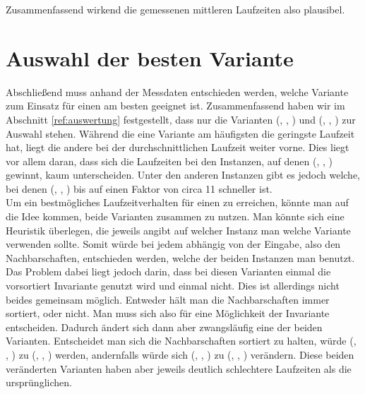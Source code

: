 Zusammenfassend wirkend die gemessenen mittleren Laufzeiten 
also plausibel.




\section{Auswahl der besten Variante}
\label{sec:entscheidung}
Abschließend muss anhand der Messdaten entschieden werden, welche Variante zum Einsatz für
einen \ct{} am besten geeignet ist.
Zusammenfassend haben wir im Abschnitt \ref{ref:auswertung} festgestellt, 
dass nur die Varianten (\SorSor, \true, \distr) und (\SeaUSet, \false, \perm) zur Auswahl stehen.
Während die eine Variante am häufigsten die geringste Laufzeit hat, liegt die andere 
bei der durchschnittlichen Laufzeit weiter vorne. Dies liegt vor allem daran, dass sich 
die Laufzeiten bei den Instanzen, auf denen (\SeaUSet, \false, \perm) \glqq gewinnt\grqq{}, kaum unterscheiden.
Unter den anderen Instanzen gibt es jedoch welche, bei denen (\SorSor, \true, \distr) bis auf einen
Faktor von circa 11 schneller ist.
\\

Um ein bestmögliches Laufzeitverhalten für einen \ct{} zu erreichen, könnte man auf die Idee kommen, 
beide Varianten zusammen zu nutzen. Man könnte sich eine Heuristik überlegen, die jeweils angibt 
auf welcher Instanz man welche Variante verwenden sollte. Somit würde bei jedem \ct{} abhängig von 
der Eingabe, also den Nachbarschaften, entschieden werden, welche der beiden Instanzen man benutzt. 
Das Problem dabei liegt jedoch darin, dass bei diesen Varianten einmal die vorsortiert Invariante
genutzt wird und einmal nicht. Dies ist allerdings nicht beides gemeinsam möglich. Entweder hält man die
Nachbarschaften immer sortiert, oder nicht. Man muss sich also für eine Möglichkeit der
Invariante entscheiden. Dadurch ändert sich dann aber zwangsläufig  eine der beiden Varianten. 
Entscheidet man sich die Nachbarschaften sortiert zu halten, würde (\SeaUSet, \false, \perm) zu (\SeaUSet, \true, \perm){}
werden, andernfalls würde sich (\SorSor, \true, \distr) zu (\SorSor, \false, \distr) verändern.
Diese beiden \glqq veränderten\grqq{} Varianten haben aber jeweils deutlich schlechtere Laufzeiten
als die ursprünglichen.
\\

